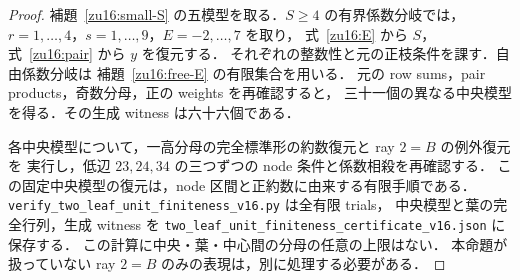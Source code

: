 \begin{proof}
補題~\ref{zu16:small-S} の五模型を取る．$S\ge4$ の有界係数分岐では，
$r=1,\ldots,4$，$s=1,\ldots,9$，$E=-2,\ldots,7$ を取り，
式~\eqref{zu16:E} から $S$，式~\eqref{zu16:pair} から $y$ を復元する．
それぞれの整数性と元の正枝条件を課す．自由係数分岐は
補題~\ref{zu16:free-E} の有限集合を用いる．
元の row sums，pair products，奇数分母，正の weights を再確認すると，
三十一個の異なる中央模型を得る．その生成 witness は六十六個である．

各中央模型について，一高分母の完全標準形の約数復元と ray $2=B$ の例外復元を
実行し，低辺 $23,24,34$ の三つずつの node 条件と係数相殺を再確認する．
この固定中央模型の復元は，node 区間と正約数に由来する有限手順である．
\nolinkurl{verify_two_leaf_unit_finiteness_v16.py} は全有限 trials，
中央模型と葉の完全行列，生成 witness を
\nolinkurl{two_leaf_unit_finiteness_certificate_v16.json} に保存する．
この計算に中央・葉・中心間の分母の任意の上限はない．
本命題が扱っていない ray $2=B$ のみの表現は，別に処理する必要がある．
\end{proof}
